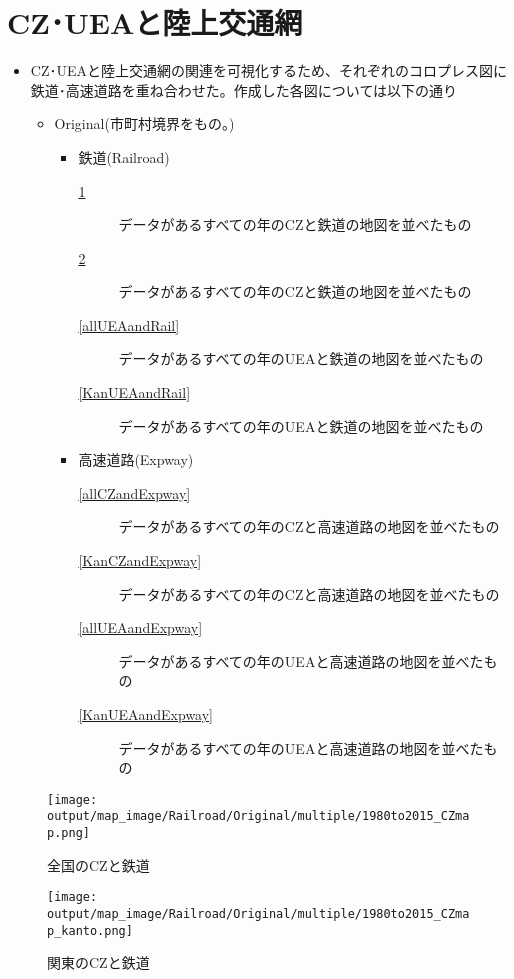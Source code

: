 \documentclass{ltjsarticle}
\begin{document}
\section{CZ･UEAと陸上交通網}
\begin{itemize}
  \item CZ･UEAと陸上交通網の関連を可視化するため、それぞれのコロプレス図に鉄道･高速道路を重ね合わせた。作成した各図については以下の通り
  \begin{itemize}
    \item Original(市町村境界をもの。)
    \begin{itemize}
      \item 鉄道(Railroad)
      \begin{description}
        \item[\ref{allCZandRail}] データがあるすべての年のCZと鉄道の地図を並べたもの
        \item[\ref{KanCZandRail}] データがあるすべての年のCZと鉄道の地図を並べたもの
        \item[\ref{allUEAandRail}] データがあるすべての年のUEAと鉄道の地図を並べたもの
        \item[\ref{KanUEAandRail}] データがあるすべての年のUEAと鉄道の地図を並べたもの
      \end{description}
      \item 高速道路(Expway)
      \begin{description}
        \item[\ref{allCZandExpway}] データがあるすべての年のCZと高速道路の地図を並べたもの
        \item[\ref{KanCZandExpway}] データがあるすべての年のCZと高速道路の地図を並べたもの
        \item[\ref{allUEAandExpway}] データがあるすべての年のUEAと高速道路の地図を並べたもの
        \item[\ref{KanUEAandExpway}] データがあるすべての年のUEAと高速道路の地図を並べたもの
      \end{description}
    \end{itemize}
  \end{itemize}
\end{itemize}


\begin{figure}[pbth]
  \centering
  \texttt{[image: output/map\_image/Railroad/Original/multiple/1980to2015\_CZmap.png]}
  \caption{\label{allCZandRail}全国のCZと鉄道}
\end{figure}

\begin{figure}[pbth]
  \centering
  \texttt{[image: output/map\_image/Railroad/Original/multiple/1980to2015\_CZmap\_kanto.png]}
  \caption{\label{KanCZandRail}関東のCZと鉄道}
\end{figure}
\end{document}
